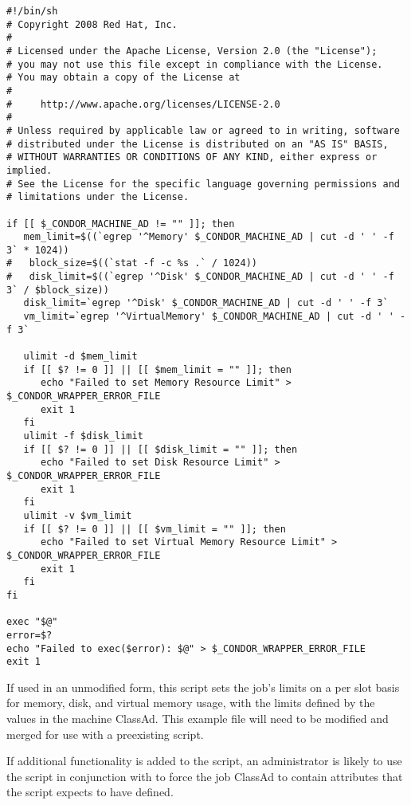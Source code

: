 \footnotesize
\begin{verbatim}
#!/bin/sh
# Copyright 2008 Red Hat, Inc.
#
# Licensed under the Apache License, Version 2.0 (the "License");
# you may not use this file except in compliance with the License.
# You may obtain a copy of the License at
#
#     http://www.apache.org/licenses/LICENSE-2.0
#
# Unless required by applicable law or agreed to in writing, software
# distributed under the License is distributed on an "AS IS" BASIS,
# WITHOUT WARRANTIES OR CONDITIONS OF ANY KIND, either express or implied.
# See the License for the specific language governing permissions and
# limitations under the License.

if [[ $_CONDOR_MACHINE_AD != "" ]]; then
   mem_limit=$((`egrep '^Memory' $_CONDOR_MACHINE_AD | cut -d ' ' -f 3` * 1024))
#   block_size=$((`stat -f -c %s .` / 1024))
#   disk_limit=$((`egrep '^Disk' $_CONDOR_MACHINE_AD | cut -d ' ' -f 3` / $block_size))
   disk_limit=`egrep '^Disk' $_CONDOR_MACHINE_AD | cut -d ' ' -f 3`
   vm_limit=`egrep '^VirtualMemory' $_CONDOR_MACHINE_AD | cut -d ' ' -f 3`

   ulimit -d $mem_limit
   if [[ $? != 0 ]] || [[ $mem_limit = "" ]]; then
      echo "Failed to set Memory Resource Limit" > $_CONDOR_WRAPPER_ERROR_FILE
      exit 1
   fi
   ulimit -f $disk_limit
   if [[ $? != 0 ]] || [[ $disk_limit = "" ]]; then
      echo "Failed to set Disk Resource Limit" > $_CONDOR_WRAPPER_ERROR_FILE
      exit 1
   fi
   ulimit -v $vm_limit
   if [[ $? != 0 ]] || [[ $vm_limit = "" ]]; then
      echo "Failed to set Virtual Memory Resource Limit" > $_CONDOR_WRAPPER_ERROR_FILE
      exit 1
   fi
fi

exec "$@"
error=$?
echo "Failed to exec($error): $@" > $_CONDOR_WRAPPER_ERROR_FILE
exit 1
\end{verbatim}
\normalsize

If used in an unmodified form,
this script sets the job's limits on a per slot basis for
memory, disk, and virtual memory usage,
with the limits defined by the values in the machine ClassAd.
This example file will need to be modified and merged for use with a
preexisting  script.

If additional functionality is added to the script,
an administrator is likely to use the  script
in conjunction with  to force the job ClassAd
to contain attributes that the  script
expects to have defined.

